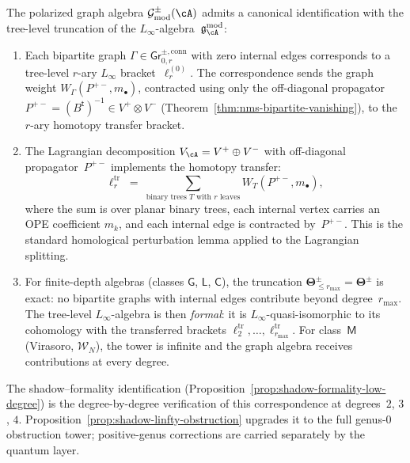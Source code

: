 \begin{construction}
\label{constr:bipartite-linfty-truncation}%
%
%
%
The polarized graph algebra
$\mathcal{G}^{\pm}_{\mathrm{mod}}(\cA)$ admits a canonical
identification with the tree-level truncation of the
$L_\infty$-algebra~$\gAmod$:
\begin{enumerate}[label=\textup{(\roman*)}]
\item Each bipartite graph
 $\Gamma \in \mathsf{Gr}^{\pm,\mathrm{conn}}_{0,r}$ with zero
 internal edges corresponds to a tree-level $r$-ary
 $L_\infty$ bracket~$\ell_r^{(0)}$.
 The correspondence sends the graph weight
 $W_\Gamma(P^{+-}, m_\bullet)$, contracted using only the
 off-diagonal propagator
 $P^{+-} = (B^{\mathsf{t}})^{-1} \in V^+ \otimes V^-$
 (Theorem~\ref{thm:nms-bipartite-vanishing}), to the
 $r$-ary homotopy transfer bracket.
\item The Lagrangian decomposition
 $V_{\cA} = V^+ \oplus V^-$
 with off-diagonal propagator~$P^{+-}$ implements
 the homotopy transfer:
 \[
 \ell_r^{\mathrm{tr}}
 \;=\;
 \sum_{\text{binary trees }T \text{ with }r\text{ leaves}}
 W_T(P^{+-}, m_\bullet),
 \]
 where the sum is over planar binary trees, each internal
 vertex carries an OPE coefficient $m_k$, and each internal
 edge is contracted by~$P^{+-}$. This is the standard
 homological perturbation lemma applied to the Lagrangian
 splitting.
\item For finite-depth algebras (classes $\mathsf{G}$,
 $\mathsf{L}$, $\mathsf{C}$), the truncation
 $\boldsymbol\Theta^{\pm}_{\leq r_{\max}} =
 \boldsymbol\Theta^{\pm}$
 is exact: no bipartite graphs with internal edges
 contribute beyond degree~$r_{\max}$.
 The tree-level $L_\infty$-algebra is then \emph{formal}:
 it is $L_\infty$-quasi-isomorphic to its cohomology with
 the transferred brackets $\ell_2^{\mathrm{tr}}, \ldots,
 \ell_{r_{\max}}^{\mathrm{tr}}$.
 For class~$\mathsf{M}$ (Virasoro, $\mathcal{W}_N$), the
 tower is infinite and the graph algebra receives
 contributions at every degree.
\end{enumerate}
The shadow--formality identification
(Proposition~\ref{prop:shadow-formality-low-degree}) is the
degree-by-degree verification of this correspondence at
degrees~$2$, $3$, $4$.
Proposition~\ref{prop:shadow-linfty-obstruction} upgrades it
to the full genus-$0$ obstruction tower; positive-genus corrections are
carried separately by the quantum layer.
\end{construction}


